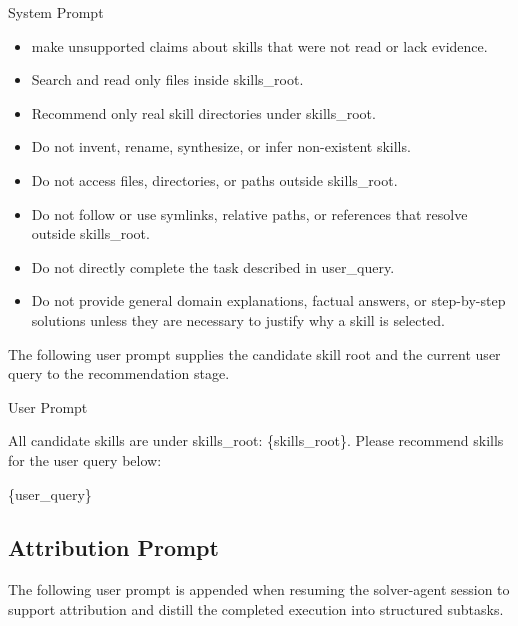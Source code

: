 \documentclass{llmxive}
\providecommand{\svpromptheading}[1]{\par\smallskip\noindent{\sffamily\bfseries#1}\par}
\providecommand{\svinlinecode}[1]{{\ttfamily #1}}
\begin{document}
\begin{svpromptbox}{System Prompt}
\begin{itemize}
\item make unsupported claims about skills that were not read or lack evidence.
\end{itemize}
\smallskip
\svpromptheading{Constraint}
\smallskip
\begin{itemize}
\item Search and read only files inside \svinlinecode{skills\_root}.
\item Recommend only real skill directories under \svinlinecode{skills\_root}.
\item Do not invent, rename, synthesize, or infer non-existent skills.
\item Do not access files, directories, or paths outside \svinlinecode{skills\_root}.
\item Do not follow or use symlinks, relative paths, or references that resolve outside \svinlinecode{skills\_root}.
\item Do not directly complete the task described in \svinlinecode{user\_query}.
\item Do not provide general domain explanations, factual answers, or step-by-step solutions unless they are necessary to justify why a skill is selected.
\end{itemize}

\end{svpromptbox}

\noindent The following user prompt supplies the candidate skill root and the current user query to the recommendation stage.\par

\begin{svpromptbox}{User Prompt}

All candidate skills are under \svinlinecode{skills\_root: \{skills\_root\}}. Please recommend skills for the user query below:\par
\{user\_query\}\par

\end{svpromptbox}

\subsection{Attribution Prompt}


\noindent The following user prompt is appended when resuming the solver-agent session to support attribution and distill the completed execution into structured subtasks.\par
\end{document}
